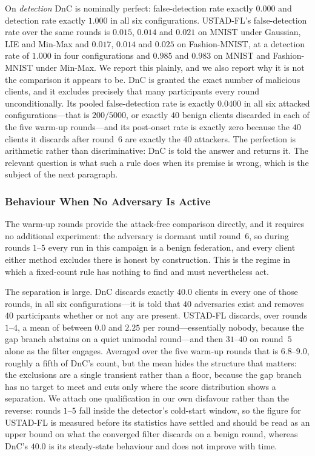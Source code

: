 \documentclass[journal]{IEEEtran}
\begin{document}
On \emph{detection} DnC is nominally perfect: false-detection rate exactly $0.000$ and detection rate exactly $1.000$ in all six configurations. USTAD-FL's false-detection rate over the same rounds is $0.015$, $0.014$ and $0.021$ on MNIST under Gaussian, LIE and Min-Max and $0.017$, $0.014$ and $0.025$ on Fashion-MNIST, at a detection rate of $1.000$ in four configurations and $0.985$ and $0.983$ on MNIST and Fashion-MNIST under Min-Max. We report this plainly, and we also report why it is not the comparison it appears to be. DnC is granted the exact number of malicious clients, and it excludes precisely that many participants every round unconditionally. Its pooled false-detection rate is exactly $0.0400$ in all six attacked configurations---that is $200/5000$, or exactly $40$ benign clients discarded in each of the five warm-up rounds---and its post-onset rate is exactly zero because the $40$ clients it discards after round~$6$ are exactly the $40$ attackers. The perfection is arithmetic rather than discriminative: DnC is told the answer and returns it. The relevant question is what such a rule does when its premise is wrong, which is the subject of the next paragraph.

\subsubsection{Behaviour When No Adversary Is Active}
The warm-up rounds provide the attack-free comparison directly, and it requires no additional experiment: the adversary is dormant until round~$6$, so during rounds $1$--$5$ every run in this campaign is a benign federation, and every client either method excludes there is honest by construction. This is the regime in which a fixed-count rule has nothing to find and must nevertheless act.

The separation is large. DnC discards exactly $40.0$ clients in every one of those rounds, in all six configurations---it is told that $40$ adversaries exist and removes $40$ participants whether or not any are present. USTAD-FL discards, over rounds $1$--$4$, a mean of between $0.0$ and $2.25$ per round---essentially nobody, because the gap branch abstains on a quiet unimodal round---and then $31$--$40$ on round~$5$ alone as the filter engages. Averaged over the five warm-up rounds that is $6.8$--$9.0$, roughly a fifth of DnC's count, but the mean hides the structure that matters: the exclusions are a single transient rather than a floor, because the gap branch has no target to meet and cuts only where the score distribution shows a separation. We attach one qualification in our own disfavour rather than the reverse: rounds $1$--$5$ fall inside the detector's cold-start window, so the figure for USTAD-FL is measured before its statistics have settled and should be read as an upper bound on what the converged filter discards on a benign round, whereas DnC's $40.0$ is its steady-state behaviour and does not improve with time.
\end{document}
